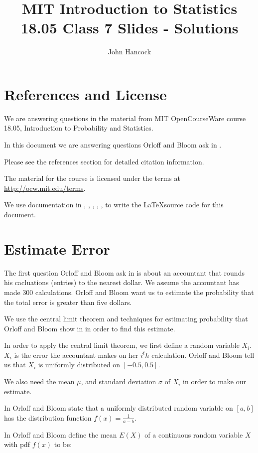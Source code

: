 \documentclass[a4paper,11pt]{article}
\author{John Hancock}
\title{MIT Introduction to Statistics 18.05 Class 7 Slides - Solutions}
\begin{document}
\maketitle
\tableofcontents
\section{References and License}
We are answering questions in the material from MIT OpenCourseWare
course 18.05, Introduction to Probability and Statistics.

In this document we are answering questions Orloff and Bloom ask in
\cite{slides7}.

Please see the references section for detailed citation information.

The material for the course is licensed under the terms at
\url{http://ocw.mit.edu/terms}.

We use documentation in  \cite{logicNot}, \cite{proofs}, \cite{bars},
\cite{packageClash}, \cite{curlyBrace}, \cite{cases} to write the \LaTeX source code for this document.

\section{Estimate Error}
The first question Orloff and Bloom ask in \cite{slides7} is about an
accountant that rounds his cacluations (entries) to the nearest dollar.  We
assume the accountant has made 300 calculations.  Orloff and Bloom want us
to estimate the probability that the total error is greater than five
dollars.

We use the central limit theorem \cite{reading6b} and techniques for estimating
probability that Orloff and Bloom show in \cite{reading6b} in order to find
this estimate.

In order to apply the central limit theorem, we first define a random variable
$X_i$.  $X_i$ is the error the accountant makes on her $i^th$ calculation.
Orloff and Bloom tell us that $X_i$ is uniformly distributed on
$\left[-0.5, 0.5 \right]$.

We also need the mean $\mu$, and standard deviation $\sigma$ of $X_i$ in order
to make our estimate.

In \cite{reading5c} Orloff and Bloom state that a uniformly distributed random
variable on $\left[a, b \right]$ has the distribution function
$f\left(x \right) = \frac{1}{a-b}$.

In \cite{reading6a} Orloff and Bloom define the mean $E\left(X \right)$ of a
continuous random variable $X$ with pdf $f\left(x \right)$ to be:
\end{document}
